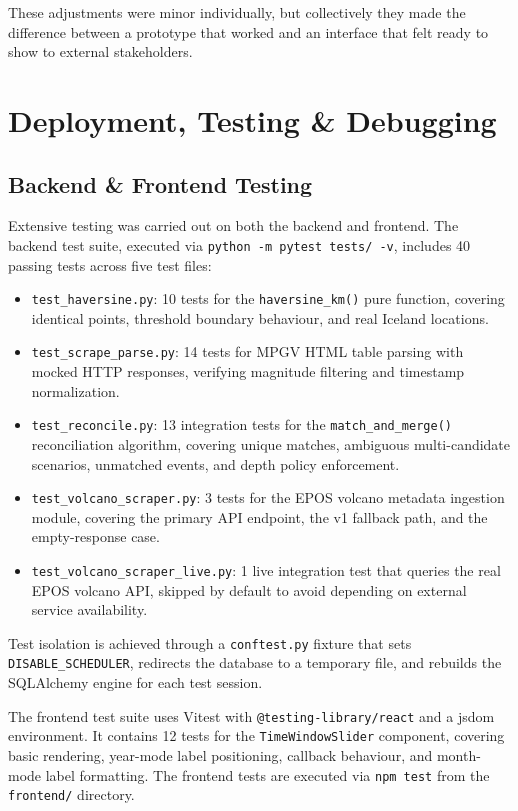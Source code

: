 \documentclass[12pt]{article}
\begin{document}
These adjustments were minor individually, but collectively they made the difference between a prototype that worked and an interface that felt ready to show to external stakeholders.

\newpage

\section{Deployment, Testing \& Debugging}
\subsection{Backend \& Frontend Testing}
Extensive testing was carried out on both the backend and frontend. The backend test suite, executed via \texttt{python -m pytest tests/ -v}, includes 40 passing tests across five test files:

\begin{itemize}
    \item \texttt{test\_haversine.py}: 10 tests for the \texttt{haversine\_km()} pure function, covering identical points, threshold boundary behaviour, and real Iceland locations.
    \item \texttt{test\_scrape\_parse.py}: 14 tests for MPGV HTML table parsing with mocked HTTP responses, verifying magnitude filtering and timestamp normalization.
    \item \texttt{test\_reconcile.py}: 13 integration tests for the \texttt{match\_and\_merge()} reconciliation algorithm, covering unique matches, ambiguous multi-candidate scenarios, unmatched events, and depth policy enforcement.
    \item \texttt{test\_volcano\_scraper.py}: 3 tests for the EPOS volcano metadata ingestion module, covering the primary API endpoint, the v1 fallback path, and the empty-response case.
    \item \texttt{test\_volcano\_scraper\_live.py}: 1 live integration test that queries the real EPOS volcano API, skipped by default to avoid depending on external service availability.
\end{itemize}

Test isolation is achieved through a \texttt{conftest.py} fixture that sets \texttt{DISABLE\_SCHEDULER}, redirects the database to a temporary file, and rebuilds the SQLAlchemy engine for each test session.

The frontend test suite uses Vitest with \texttt{@testing-library/react} and a jsdom environment. It contains 12 tests for the \texttt{TimeWindowSlider} component, covering basic rendering, year-mode label positioning, callback behaviour, and month-mode label formatting. The frontend tests are executed via \texttt{npm test} from the \texttt{frontend/} directory.
\end{document}
